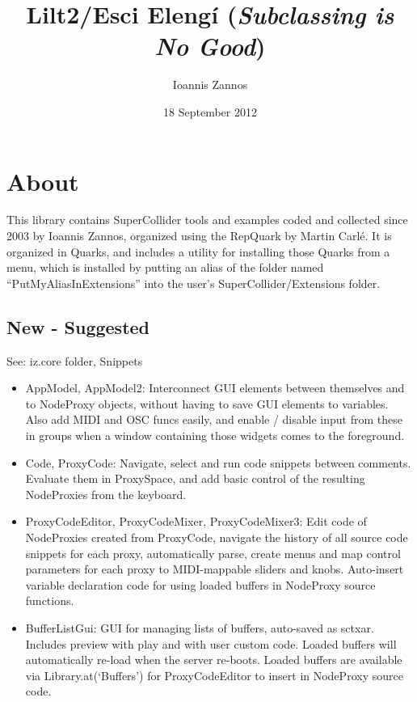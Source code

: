 \documentclass[11pt, a4paper]{scrartcl}
\begin{document}
\title{Lilt2/Esci Eleng\'i (\emph{Subclassing is No Good})}
\author{Ioannis Zannos}
\date{18 September 2012}
\maketitle


\section*{About}
\label{sec-1}


This library contains SuperCollider tools and examples coded and collected since 2003 by Ioannis Zannos, organized using the RepQuark by Martin Carl\'e. It is organized in Quarks, and includes a utility for installing those Quarks from a menu, which is installed by putting an alias of the folder named ``PutMyAliasInExtensions'' into the user's SuperCollider/Extensions folder. 
\subsection*{New - Suggested}
\label{sec-1_1}


See: iz.core folder, Snippets

\begin{itemize}
\item AppModel, AppModel2: Interconnect GUI elements between themselves and to NodeProxy objects, without having to save GUI elements to variables. Also add MIDI and OSC funcs easily, and enable / disable input from these in groups when a window containing those widgets comes to the foreground.
\item Code, ProxyCode: Navigate, select and run code snippets between comments. Evaluate them in ProxySpace, and add basic control of the resulting NodeProxies from the keyboard.
\item ProxyCodeEditor, ProxyCodeMixer, ProxyCodeMixer3: Edit code of NodeProxies created from ProxyCode, navigate the history of all source code snippets for each proxy, automatically parse, create menus and map control parameters for each proxy to MIDI-mappable sliders and knobs.  Auto-insert variable declaration code for using loaded buffers in NodeProxy source functions.
\item BufferListGui: GUI for managing lists of buffers, auto-saved as sctxar. Includes preview with play and with user custom code. Loaded buffers will automatically re-load when the server re-boots. Loaded buffers are available via Library.at(`Buffers') for ProxyCodeEditor to insert in NodeProxy source code.
\end{itemize}
\end{document}
